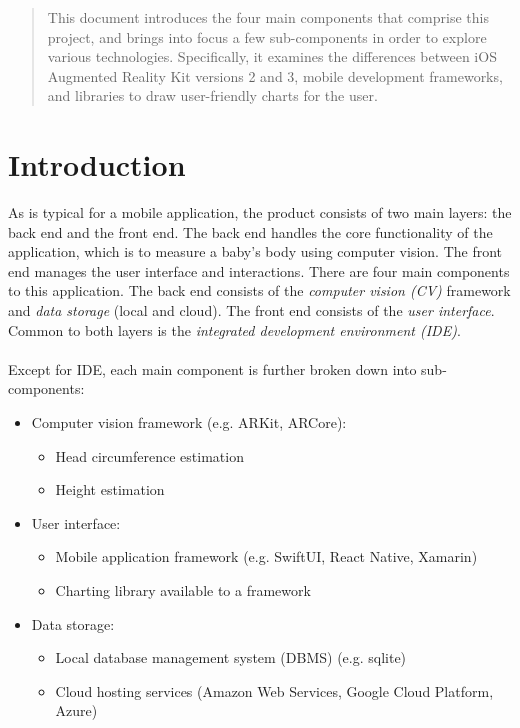 \documentclass[onecolumn, draftclsnofoot,10pt, compsoc]{IEEEtran}
\begin{document}
\begin{titlepage}
\begin{singlespace}
\begin{abstract}
        	This document introduces the four main components that comprise this project, and brings into focus a few sub-components in order to explore various technologies.
        	Specifically, it examines the differences between iOS Augmented Reality Kit versions 2 and 3, mobile development frameworks, and libraries to draw user-friendly charts for the user.
        \end{abstract}     
    \end{singlespace}
\end{titlepage}
\newpage
{}
\tableofcontents
\clearpage

\section{Introduction}
As is typical for a mobile application, the product consists of two main layers: the back end and the front end.
The back end handles the core functionality of the application, which is to measure a baby's body using computer vision.
The front end manages the user interface and interactions. There are four main components to this application.
The back end consists of the \textit{computer vision (CV)} framework and \textit{data storage} (local and cloud).
The front end consists of the \textit{user interface}. Common to both layers is the \textit{integrated development environment (IDE)}.
\\\\
\noindent Except for IDE, each main component is further broken down into sub-components:
\begin{itemize}
    \item Computer vision framework (e.g. ARKit, ARCore):
    \begin{itemize}
        \item Head circumference estimation
        \item Height estimation
    \end{itemize}
    
    \item User interface:
        \begin{itemize}
            \item Mobile application framework (e.g. SwiftUI, React Native, Xamarin)
            \item Charting library available to a framework
        \end{itemize}
    
    \item Data storage:
        \begin{itemize}
            \item Local database management system (DBMS) (e.g. sqlite)
            \item Cloud hosting services (Amazon Web Services, Google Cloud Platform, Azure)
        \end{itemize}
\end{itemize}
\end{document}
